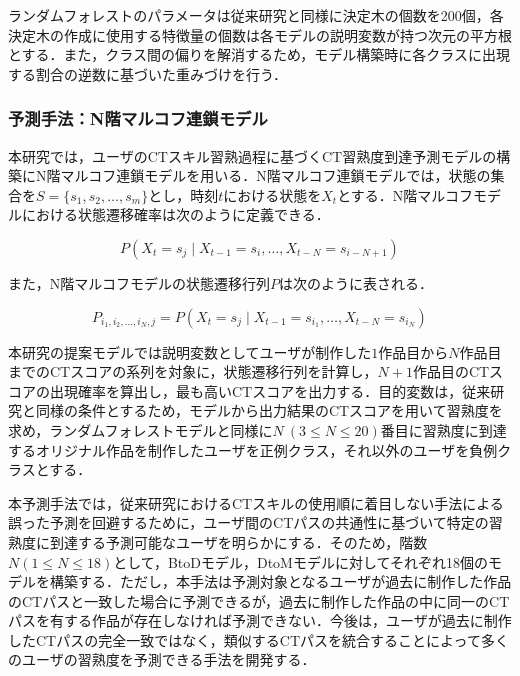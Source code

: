 \documentclass[submit]{ipsj}
\begin{document}

ランダムフォレストのパラメータは従来研究と同様に決定木の個数を200個，各決定木の作成に使用する特徴量の個数は各モデルの説明変数が持つ次元の平方根とする．また，クラス間の偏りを解消するため，モデル構築時に各クラスに出現する割合の逆数に基づいた重みづけを行う．



\subsubsection{予測手法：N階マルコフ連鎖モデル}\label{sec:marcov-approach}

本研究では，ユーザのCTスキル習熟過程に基づくCT習熟度到達予測モデルの構築にN階マルコフ連鎖モデルを用いる．N階マルコフ連鎖モデルでは，状態の集合を$S=\{s_1,s_2,\ldots,s_m\}$とし，時刻$t$における状態を$X_t$とする．N階マルコフモデルにおける状態遷移確率は次のように定義できる．

\begin{equation}
P(X_t=s_j\mid X_{t-1}=s_i,\ldots,X_{t-N}=s_{i-N+1})
\end{equation}

また，N階マルコフモデルの状態遷移行列$P$は次のように表される．

\begin{equation}
P_{i_1,i_2,\ldots,i_N,j}=P(X_t=s_j \mid X_{t-1} = s_{i_1}, \ldots, X_{t-N} = s_{i_N})
\end{equation}

本研究の提案モデルでは説明変数としてユーザが制作した$1$作品目から$N$作品目までのCTスコアの系列を対象に，状態遷移行列を計算し，$N+1$作品目のCTスコアの出現確率を算出し，最も高いCTスコアを出力する．目的変数は，従来研究と同様の条件とするため，モデルから出力結果のCTスコアを用いて習熟度を求め，ランダムフォレストモデルと同様に{$N~(3 \leq N \leq 20)$}番目に習熟度\textcolor{red}{}に到達するオリジナル作品を制作したユーザを正例クラス，それ以外のユーザを負例クラスとする．

本予測手法では，従来研究におけるCTスキルの使用順に着目しない手法による誤った予測を回避するために，ユーザ間のCTパスの共通性に基づいて特定の習熟度に到達する予測可能なユーザを明らかにする．そのため，階数$N(1\leq N \leq 18)$として，BtoDモデル，DtoMモデルに対してそれぞれ18個のモデルを構築する．ただし，本手法は予測対象となるユーザが過去に制作した作品のCTパスと一致した場合に予測できるが，過去に制作した作品の中に同一のCTパスを有する作品が存在しなければ予測できない．今後は，ユーザが過去に制作したCTパスの完全一致ではなく，類似するCTパスを統合することによって多くのユーザの習熟度を予測できる手法を開発する．
\end{document}
